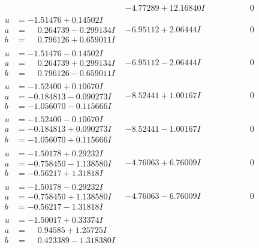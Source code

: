 \documentclass[1p]{elsarticle_modified}
\theoremstyle{definition}
\begin{document}
$$\begin{array}{c|c|c}
 & -4.77289 + 12.16840 I & \phantom{-0.000000 } 0 \\ \hline\begin{aligned}
u &= -1.51476 + 0.14502 I \\
a &= \phantom{-}0.264739 - 0.299134 I \\
b &= \phantom{-}0.796126 + 0.659011 I\end{aligned}
 & -6.95112 + 2.06444 I & \phantom{-0.000000 } 0 \\ \hline\begin{aligned}
u &= -1.51476 - 0.14502 I \\
a &= \phantom{-}0.264739 + 0.299134 I \\
b &= \phantom{-}0.796126 - 0.659011 I\end{aligned}
 & -6.95112 - 2.06444 I & \phantom{-0.000000 } 0 \\ \hline\begin{aligned}
u &= -1.52400 + 0.10670 I \\
a &= -0.184813 - 0.090273 I \\
b &= -1.056070 - 0.115666 I\end{aligned}
 & -8.52441 + 1.00167 I & \phantom{-0.000000 } 0 \\ \hline\begin{aligned}
u &= -1.52400 - 0.10670 I \\
a &= -0.184813 + 0.090273 I \\
b &= -1.056070 + 0.115666 I\end{aligned}
 & -8.52441 - 1.00167 I & \phantom{-0.000000 } 0 \\ \hline\begin{aligned}
u &= -1.50178 + 0.29232 I \\
a &= -0.758450 - 1.138580 I \\
b &= -0.56217 + 1.31818 I\end{aligned}
 & -4.76063 + 6.76009 I & \phantom{-0.000000 } 0 \\ \hline\begin{aligned}
u &= -1.50178 - 0.29232 I \\
a &= -0.758450 + 1.138580 I \\
b &= -0.56217 - 1.31818 I\end{aligned}
 & -4.76063 - 6.76009 I & \phantom{-0.000000 } 0 \\ \hline\begin{aligned}
u &= -1.50017 + 0.33374 I \\
a &= \phantom{-}0.94585 + 1.25725 I \\
b &= \phantom{-}0.423389 - 1.318380 I\end{aligned}

\end{array}$$
\end{document}
